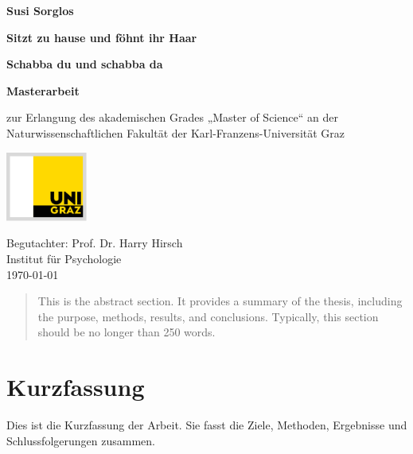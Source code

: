 \documentclass[man]{apa7}
\begin{document}
\begin{titlepage}
\centering
\vspace*{1cm}

\textbf{Susi Sorglos}

\large

\vspace{1.5cm}
\Large
\textbf{Sitzt zu hause und föhnt ihr Haar}

\vspace{0.5cm}
\normalsize
\textbf{Schabba du und schabba da}

\vspace{1.5cm}
\Large
\textbf{Masterarbeit}

\vspace{0.5cm}




\normalsize
zur Erlangung des akademischen Grades „Master of Science“
an der Naturwissenschaftlichen Fakultät
der Karl-Franzens-Universität Graz

\vspace{3cm}

\includegraphics[width=0.2\textwidth]{figures/uni-graz-logo.pdf}
\vspace{3cm}

\centering
\centering
Begutachter: Prof. Dr. Harry Hirsch\\
Institut für Psychologie\\
\today


\end{titlepage}

\newpage
\begin{abstract}

This is the abstract section. It provides a summary of the thesis, including the purpose, methods, results, and conclusions. Typically, this section should be no longer than 250 words.
\end{abstract}

\newpage
\section*{Kurzfassung}
Dies ist die Kurzfassung der Arbeit. Sie fasst die Ziele, Methoden, Ergebnisse und Schlussfolgerungen zusammen.
\end{document}
